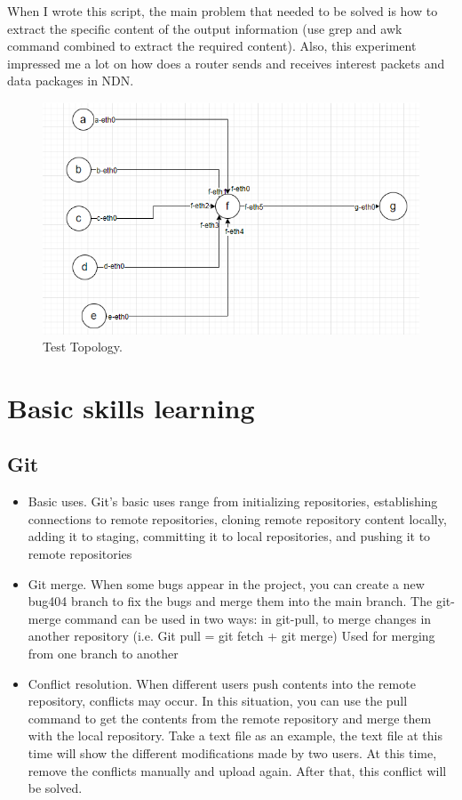 \documentclass[conference]{IEEEtran}
\begin{document}
When I wrote this script, the main problem that needed to be solved is how to extract the specific content of the output information
(use grep and awk command combined to extract the required content). Also, this experiment impressed me a lot on how does a router sends and receives interest packets and data packages in NDN.
\begin{figure}[htbp]
\centerline{\includegraphics[scale=0.57]{fig_tp.png}}
\caption{ Test Topology.}
\label{fig_tp}
\end{figure}

\section{Basic skills learning}
\subsection{Git}
\begin{itemize}
    \item Basic uses. Git's basic uses range from initializing repositories, establishing connections to remote repositories, cloning remote repository content locally, adding it to staging, committing it to local repositories,  and pushing it to remote repositories
    \item
    Git merge. When some bugs appear in the project, you can create a new bug404 branch to fix the bugs and merge them into the main branch.
    The git-merge command can be used in two ways: in git-pull, to merge changes in another repository (i.e. Git pull = git fetch + git merge)
    Used for merging from one branch to another
    \item
    Conflict resolution. When different users push contents into the remote repository, conflicts may occur. In this situation, you can use the pull command to get the contents from the remote repository and merge them with the local repository. Take a text file as an example, the text file at this time will show the different modifications made by two users. At this time, remove the conflicts manually and upload again. After that, this conflict will be solved. 
\end{itemize}
\end{document}

